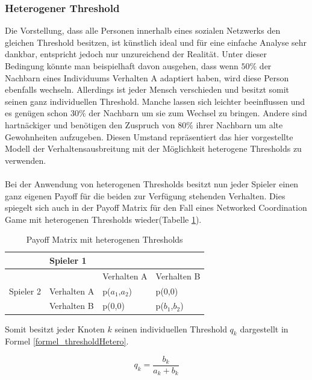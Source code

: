 \documentclass[12pt]{article}
\begin{document}
\subsubsection{Heterogener Threshold}
Die Vorstellung, dass alle Personen innerhalb eines sozialen Netzwerks den gleichen Threshold besitzen, ist künstlich ideal und für eine einfache Analyse sehr dankbar, entspricht jedoch nur unzureichend der Realität. Unter dieser Bedingung könnte man beispielhaft davon ausgehen, dass wenn $50\%$ der Nachbarn eines Individuums Verhalten A adaptiert haben, wird diese Person ebenfalls wechseln. Allerdings ist jeder Mensch verschieden und besitzt somit seinen ganz individuellen Threshold. Manche lassen sich leichter beeinflussen und es genügen schon $30\%$ der Nachbarn um sie zum Wechsel zu bringen. Andere sind hartnäckiger und benötigen den Zuspruch von $80\%$ ihrer Nachbarn um alte Gewohnheiten aufzugeben. Diesen Umstand repräsentiert das hier vorgestellte Modell der Verhaltensausbreitung mit der Möglichkeit heterogene Thresholds zu verwenden.\\\\
Bei der Anwendung von heterogenen Thresholds besitzt nun jeder Spieler einen ganz eigenen Payoff für die beiden zur Verfügung stehenden Verhalten. Dies spiegelt sich auch in der Payoff Matrix für den Fall eines Networked Coordination Game mit heterogenen Thresholds wieder(Tabelle \ref{table_payofHetero}).
\begin{table}[h]
\centering
\caption{Payoff Matrix mit heterogenen Thresholds}
\label{table_payofHetero}
\begin{tabular}{|l|l|l|l|}
\hline
                           & \multicolumn{3}{l|}{Spieler 1}           \\ \hline
\multirow{3}{*}{Spieler 2} &             & Verhalten A  & Verhalten B \\ \cline{2-4} 
                           & Verhalten A & p($a_1$,$a_2$) & p(0,0)      \\ \cline{2-4} 
                           & Verhalten B & p(0,0)       & p($b_1$,$b_2$)      \\ \hline
\end{tabular}
\end{table}
Somit besitzt jeder Knoten $k$ seinen individuellen Threshold $q_k$ dargestellt in Formel \ref{formel_thresholdHetero}.

%
  \begin{equation}
 \label{formel_thresholdHetero}
 q_k =  \frac{b_k}{a_k+b_k}
 \end{equation}
 
\end{document}

